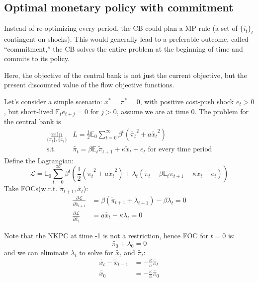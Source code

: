 \subsection{Optimal monetary policy with commitment}
Instead of re-optimizing every period, the CB could plan a MP rule
(a set of $\{i_t\}_t$ contingent on shocks). This would generally lead to
a preferable outcome, called “commitment,” the CB solves the entire problem at the beginning of time and commits to its policy.

Here, the objective of the central bank is not just the current objective, 
but the present discounted value of the flow objective functions. 

Let's consider a simple scenario: $x^* = \pi ^* = 0$, with positive cost-push shock $e_t > 0$,
but short-lived $\mathbb{E}_t e_{t+j} = 0$ for $j>0$, assume we are at time 0.
The problem for the central bank is
\begin{align*}
    \min_{\{\pi_t\}, \{x_t\}} & L = \frac{1}{2} \mathbb{E}_0 \sum_{t=0}^{\infty} \beta^t \left(\tilde{\pi_t}^2 + a \tilde{x_t}^2\right) \\
    \text{s.t.}\quad & \tilde{\pi_t} = \beta \mathbb{E}_t \tilde{\pi}_{t+1} + \kappa \tilde{x}_t + e_t \text{ for every time period}
\end{align*}
Define the Lagrangian:
\[\mathcal{L} = \mathbb{E}_0 \sum_{t=0}^{\infty} \beta^t \left(\frac{1}{2} \left(\tilde{\pi_t}^2 + a\tilde{x_t}^2\right) + \lambda_t \left(\tilde{\pi_t} - \beta \mathbb{E}_t \tilde{\pi}_{t+1} - \kappa \tilde{x}_t - e_t\right) \right) \]
Take FOCs(w.r.t. $\tilde{\pi}_{t+1}, \tilde{x_t}$):
\begin{align*}
    \frac{\partial \mathcal{L}}{\partial \tilde{\pi}_{t+1}} &= \beta (\tilde{\pi}_{t+1} + \lambda_{t+1}) - \beta\lambda_{t}= 0 \\
    \frac{\partial \mathcal{L}}{\partial \tilde{x_t}} &= a\tilde{x_t} - \kappa \lambda_t = 0
\end{align*}

Note that the NKPC at time -1 is not a restriction, hence FOC for $t=0$ is:
\[\tilde{\pi_0} + \lambda_0 = 0\]
and we can eliminate $\lambda_t$ to solve for $\tilde{x_t}$ and $\tilde{\pi_t}$:
\begin{align*}
    \tilde{x_t} - \tilde{x}_{t-1} &= -\frac{\kappa}{a} \tilde{\pi_t} \\
    \tilde{x_0} &= -\frac{\kappa}{a} \tilde{\pi_0}
\end{align*}

